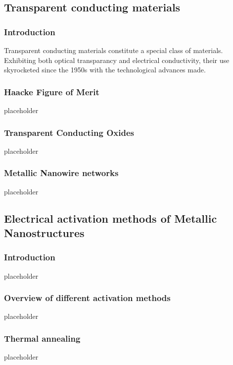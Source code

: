 \subsection{Transparent conducting materials}
    \subsubsection{Introduction}
        Transparent conducting materials constitute a special class of materials. Exhibiting both optical transparancy and electrical conductivity, their use skyrocketed since the 1950s with the technological advances made. 
    \subsubsection{Haacke Figure of Merit}
        placeholder
    \subsubsection{Transparent Conducting Oxides}
        placeholder
    \subsubsection{Metallic Nanowire networks}
        placeholder
\subsection{Electrical activation methods of Metallic Nanostructures}
    \subsubsection{Introduction}
        placeholder
    \subsubsection{Overview of different activation methods}
        placeholder
    \subsubsection{Thermal annealing}
        placeholder